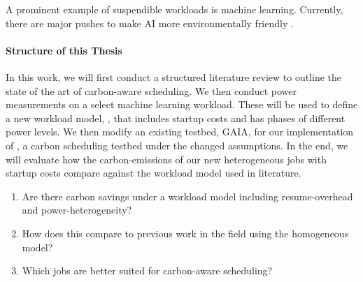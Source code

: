 A prominent example of suspendible workloads is machine learning. Currently, there are major pushes to make AI more environmentally friendly \cite{schwartz_green_2019}. 

\paragraph{Structure of this Thesis}

In this work, we will first conduct a structured literature review to outline the state of the art of carbon-aware scheduling. 
We then conduct power measurements on a select machine learning workload.
These will be used to define a new workload model, \modelname{}, that includes startup costs and has phases of different power levels. 
We then modify an existing testbed, GAIA, for our implementation of \programname{}, a carbon scheduling testbed under the changed assumptions.
In the end, we will evaluate how the carbon-emissions of our new heterogeneous jobs with startup costs compare against the workload model used in literature.

\begin{enumerate}
    \item Are there carbon savings under a workload model including resume-overhead and power-heterogeneity?
    \item How does this compare to previous work in the field using the homogeneous model?
    \item Which jobs are better suited for carbon-aware scheduling?
\end{enumerate}
